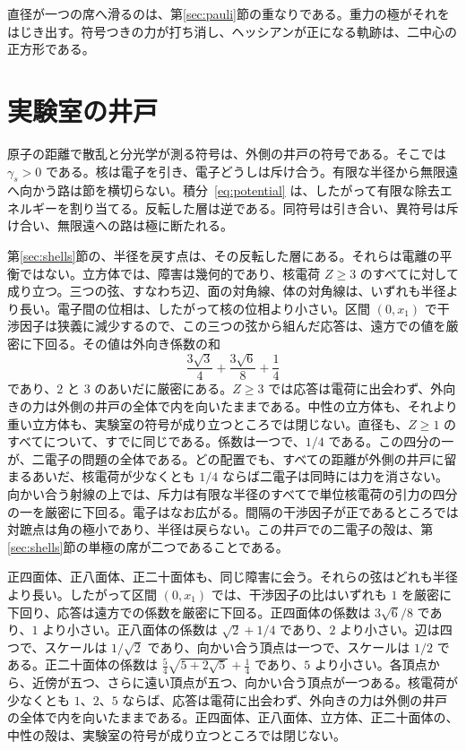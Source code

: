 \documentclass[a4paper]{article}
\begin{document}
直径が一つの席へ滑るのは、第\ref{sec:pauli}節の重なりである。重力の極がそれをはじき出す。符号つきの力が打ち消し、ヘッシアンが正になる軌跡は、二中心の正方形である。

\section{実験室の井戸}
\label{sec:lab}

原子の距離で散乱と分光学が測る符号は、外側の井戸の符号である。そこでは \(\gamma_s>0\) である。核は電子を引き、電子どうしは斥け合う。有限な半径から無限遠へ向かう路は節を横切らない。積分~\eqref{eq:potential} は、したがって有限な除去エネルギーを割り当てる。反転した層は逆である。同符号は引き合い、異符号は斥け合い、無限遠への路は極に断たれる。

第\ref{sec:shells}節の、半径を戻す点は、その反転した層にある。それらは電離の平衡ではない。立方体では、障害は幾何的であり、核電荷 \(Z\ge 3\) のすべてに対して成り立つ。三つの弦、すなわち辺、面の対角線、体の対角線は、いずれも半径より長い。電子間の位相は、したがって核の位相より小さい。区間 \((0,x_1)\) で干渉因子は狭義に減少するので、この三つの弦から組んだ応答は、遠方での値を厳密に下回る。その値は外向き係数の和
\[
\frac{3\sqrt{3}}{4}+\frac{3\sqrt{6}}{8}+\frac14
\]
であり、\(2\) と \(3\) のあいだに厳密にある。\(Z\ge 3\) では応答は電荷に出会わず、外向きの力は外側の井戸の全体で内を向いたままである。中性の立方体も、それより重い立方体も、実験室の符号が成り立つところでは閉じない。直径も、\(Z\ge 1\) のすべてについて、すでに同じである。係数は一つで、\(1/4\) である。この四分の一が、二電子の問題の全体である。どの配置でも、すべての距離が外側の井戸に留まるあいだ、核電荷が少なくとも \(1/4\) ならば二電子は同時には力を消さない。向かい合う射線の上では、斥力は有限な半径のすべてで単位核電荷の引力の四分の一を厳密に下回る。電子はなお広がる。間隔の干渉因子が正であるところでは対蹠点は角の極小であり、半径は戻らない。この井戸での二電子の殻は、第\ref{sec:shells}節の単極の席が二つであることである。

正四面体、正八面体、正二十面体も、同じ障害に会う。それらの弦はどれも半径より長い。したがって区間 \((0,x_1)\) では、干渉因子の比はいずれも \(1\) を厳密に下回り、応答は遠方での係数を厳密に下回る。正四面体の係数は \(3\sqrt{6}/8\) であり、\(1\) より小さい。正八面体の係数は \(\sqrt{2}+1/4\) であり、\(2\) より小さい。辺は四つで、スケールは \(1/\sqrt{2}\) であり、向かい合う頂点は一つで、スケールは \(1/2\) である。正二十面体の係数は \(\frac54\sqrt{5+2\sqrt{5}}+\frac14\) であり、\(5\) より小さい。各頂点から、近傍が五つ、さらに遠い頂点が五つ、向かい合う頂点が一つある。核電荷が少なくとも \(1\)、\(2\)、\(5\) ならば、応答は電荷に出会わず、外向きの力は外側の井戸の全体で内を向いたままである。正四面体、正八面体、立方体、正二十面体の、中性の殻は、実験室の符号が成り立つところでは閉じない。
\end{document}
